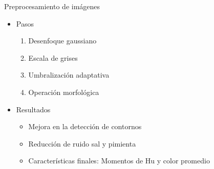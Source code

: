 \documentclass[12pt]{beamer}
\begin{document}
\begin{frame}{Preprocesamiento de imágenes}
    \begin{itemize}
        \item   Pasos
        \begin{enumerate}
            \item Desenfoque gaussiano
            \item Escala de grises
            \item Umbralización adaptativa
            \item Operación morfológica
        \end{enumerate}
        \item Resultados
        \begin{itemize}
            \item Mejora en la detección de contornos
            \item Reducción de ruido sal y pimienta
            \item Características finales: Momentos de Hu y color promedio
        \end{itemize}
    \end{itemize}
    
\end{frame}
\end{document}
